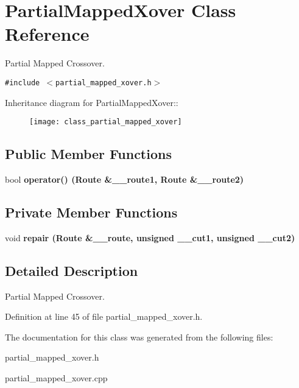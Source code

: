 \section{Partial\-Mapped\-Xover Class Reference}
\label{class_partial_mapped_xover}
Partial Mapped Crossover.  


{\tt \#include $<$partial\_\-mapped\_\-xover.h$>$}

Inheritance diagram for Partial\-Mapped\-Xover::\begin{figure}[H]
\begin{center}
\leavevmode
\texttt{[image: class\_partial\_mapped\_xover]}
\end{center}
\end{figure}
\subsection*{Public Member Functions}
\begin{CompactItemize}
\item 
bool \bf{operator()} (\bf{Route} \&\_\-\_\-route1, \bf{Route} \&\_\-\_\-route2)\label{class_partial_mapped_xover_1cda6ea86ca36e5de0125f4ba5cfc695}

\end{CompactItemize}
\subsection*{Private Member Functions}
\begin{CompactItemize}
\item 
void \bf{repair} (\bf{Route} \&\_\-\_\-route, unsigned \_\-\_\-cut1, unsigned \_\-\_\-cut2)\label{class_partial_mapped_xover_b6d4035544aff3b2b3fe4b0eeea185a2}

\end{CompactItemize}


\subsection{Detailed Description}
Partial Mapped Crossover. 



Definition at line 45 of file partial\_\-mapped\_\-xover.h.

The documentation for this class was generated from the following files:\begin{CompactItemize}
\item 
partial\_\-mapped\_\-xover.h\item 
partial\_\-mapped\_\-xover.cpp\end{CompactItemize}
